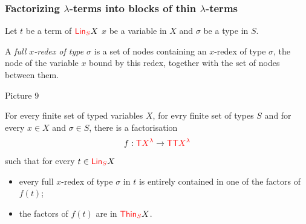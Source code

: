   



\subsubsection{Factorizing $\lambda$-terms into blocks of thin $\lambda$-terms}

\begin{definition}
Let $t$ be a term of ${\color{red}{\mathsf{Lin}_{S}}} X$ $x$ be a variable in $X$ and $\sigma$ be a type in $S$. 

 A \emph{full $x$-redex of type $\sigma$} is a set of nodes  containing an $x$-redex of type $\sigma$, the node of the variable $x$ bound by this redex, together with the set of nodes between them.
\end{definition}
\begin{center}
Picture 9
\end{center}


\begin{proposition}\label{prop:FactoIntoThin} For every finite set of typed variables $X$, for evry finite set of types $S$ and for every $x\in X$ and $\sigma\in S$, there is a factorisation $$f:{\color{red}{\mathsf T}} {\color{red}{X^\lambda}} \to {\color{red}{\mathsf T}}{\color{red}{\mathsf T}} {\color{red}{X^\lambda}}$$ 
such that for every $t\in{\color{red}{\mathsf{Lin}_{S}}} X$
\begin{itemize}
\item every full $x$-redex of type $\sigma$ in $t$ is entirely contained in one of the factors of $f(t)$;
\item the factors of $f(t)$ are in ${\color{red}{\mathsf{Thin}_{S}}} X$.
\end{itemize}
\end{proposition}

